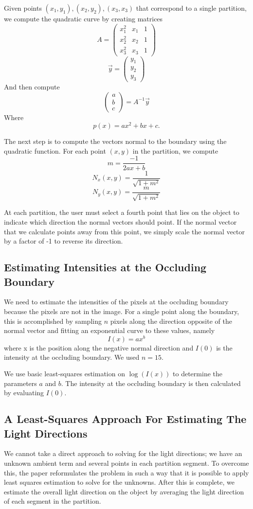\documentclass[10pt,twocolumn,letterpaper]{article}
\begin{document}
Given points $(x_1,y_1), (x_2,y_2), (x_3,x_3)$ that correspond to a single partition, we compute the quadratic curve by creating matrices 
\[A = \begin{pmatrix}
		x_1^2 & x_1 & 1\\
		x_2^2 & x_2 & 1\\
		x_3^2 & x_3 & 1
	  \end{pmatrix}\]
\[\vec{y} = \begin{pmatrix}
		y_1\\
		y_2\\
		y_3\end{pmatrix}\]
And then compute
\[\begin{pmatrix} a\\ b\\ c\end{pmatrix} = A^{-1}\vec{y}\]
Where \[p(x) = ax^2 + bx + c.\]

The next step is to compute the vectors normal to the boundary using the quadratic function. For each point $(x,y)$ in the partition, we compute \[m = \frac{-1}{2ax + b}\]
\[N_x(x,y) = \frac{1}{\sqrt{1 + m^2}}\]
\[N_y(x,y) = \frac{m}{\sqrt{1 + m^2}}\]

At each partition, the user must select a fourth point that lies on the object to indicate which direction the normal vectors should point. If the normal vector that we calculate points away from this point, we simply scale the normal vector by a factor of -1 to reverse its direction.

\subsection{Estimating Intensities at the Occluding Boundary}
We need to estimate the intensities of the pixels at the occluding boundary because the pixels are not in the image. For a single point along the boundary, this is accomplished by sampling $n$ pixels along the direction opposite of the normal vector and fitting an exponential curve to these values, namely \[I(x) = ax^{b}\] where x is the position along the negative normal direction and $I(0)$ is the intensity at the occluding boundary. We used $n = 15$.

We use basic least-squares estimation on $\log(I(x))$ to determine the parameters $a$ and $b$. The intensity at the occluding boundary is then calculated by evaluating $I(0)$.

\subsection{A Least-Squares Approach For Estimating The Light Directions}
We cannot take a direct approach to solving for the light directions; we have an unknown ambient term and several points in each partition segment. To overcome this, the paper reformulates the problem in such a way that it is possible to apply least squares estimation to solve for the unknowns. After this is complete, we estimate the overall light direction on the object by averaging the light direction of each segment in the partition.
\end{document}

